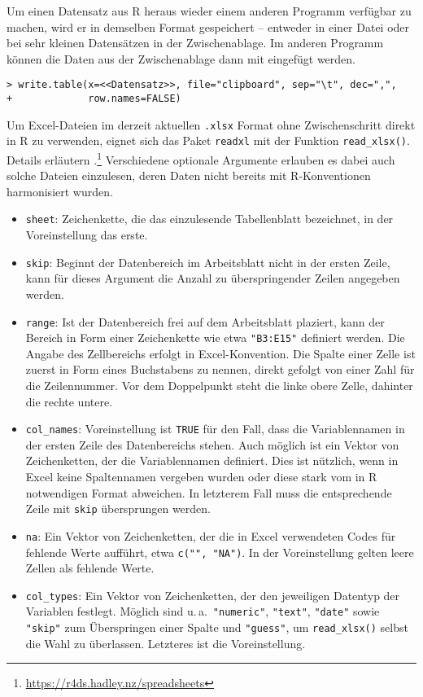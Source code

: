 Um einen Datensatz aus R heraus wieder einem anderen Programm verfügbar zu machen, wird er in demselben Format gespeichert -- entweder in einer Datei oder bei sehr kleinen Datensätzen in der Zwischenablage. Im anderen Programm können die Daten aus der Zwischenablage dann mit  eingefügt werden.
\begin{lstlisting}
> write.table(x=<<Datensatz>>, file="clipboard", sep="\t", dec=",",
+             row.names=FALSE)
\end{lstlisting}

Um Excel-Dateien im derzeit aktuellen \lstinline!.xlsx! Format ohne Zwischenschritt direkt in R zu verwenden, eignet sich das Paket \lstinline!readxl! \cite{Wickham2015a} mit der Funktion \lstinline!read_xlsx()!. Details erläutern .\footnote{\url{https://r4ds.hadley.nz/spreadsheets}} Verschiedene optionale Argumente erlauben es dabei auch solche Dateien einzulesen, deren Daten nicht bereits mit R-Konventionen harmonisiert wurden.
\begin{itemize}
\item \lstinline!sheet!: Zeichenkette, die das einzulesende Tabellenblatt bezeichnet, in der Voreinstellung das erste.
\item \lstinline!skip!: Beginnt der Datenbereich im Arbeitsblatt nicht in der ersten Zeile, kann für dieses Argument die Anzahl zu überspringender Zeilen angegeben werden.
\item \lstinline!range!: Ist der Datenbereich frei auf dem Arbeitsblatt plaziert, kann der Bereich in Form einer Zeichenkette wie etwa \lstinline!"B3:E15"! definiert werden. Die Angabe des Zellbereichs erfolgt in Excel-Konvention. Die Spalte einer Zelle ist zuerst in Form eines Buchstabens zu nennen, direkt gefolgt von einer Zahl für die Zeilennummer. Vor dem Doppelpunkt steht die linke obere Zelle, dahinter die rechte untere.
\item \lstinline!col_names!: Voreinstellung ist \lstinline!TRUE! für den Fall, dass die Variablennamen in der ersten Zeile des Datenbereichs stehen. Auch möglich ist ein Vektor von Zeichenketten, der die Variablennamen definiert. Dies ist nützlich, wenn in Excel keine Spaltennamen vergeben wurden oder diese stark vom in R notwendigen Format abweichen. In letzterem Fall muss die entsprechende Zeile mit \lstinline!skip! übersprungen werden.
\item \lstinline!na!: Ein Vektor von Zeichenketten, der die in Excel verwendeten Codes für fehlende Werte aufführt, etwa \lstinline!c("", "NA")!. In der Voreinstellung gelten leere Zellen als fehlende Werte.
\item \lstinline!col_types!: Ein Vektor von Zeichenketten, der den jeweiligen Datentyp der Variablen festlegt. Möglich sind u.\,a.\ \lstinline!"numeric"!, \lstinline!"text"!, \lstinline!"date"! sowie \lstinline!"skip"! zum Überspringen einer Spalte und \lstinline!"guess"!, um \lstinline!read_xlsx()! selbst die Wahl zu überlassen. Letzteres ist die Voreinstellung.
\end{itemize}

